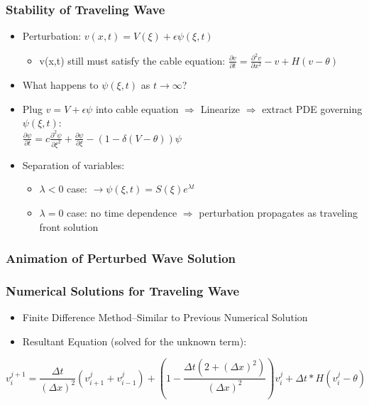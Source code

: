\documentclass{beamer}
\begin{document}
\begin{frame}
\frametitle{Stability of Traveling Wave}
\begin{itemize}
	\item Perturbation: $v(x,t)=V(\xi)+\epsilon\psi(\xi,t)$
		\begin{itemize}
			\item v(x,t) still must satisfy the cable equation: $\frac{\partial v}{\partial t}=\frac{\partial ^2 v}{\partial x^2}-v+H(v-\theta)$
		\end{itemize}
	\item What happens to $\psi(\xi,t)$ as $t\rightarrow\infty$?
	\item Plug $v=V+\epsilon\psi$ into cable equation $\Rightarrow$ Linearize $\Rightarrow$ extract PDE governing $\psi(\xi,t)$:\\
	$\frac{\partial \psi}{\partial t} = c \frac{\partial^2\psi}{\partial\xi^2} + \frac{\partial\psi}{\partial\xi} - (1 - \delta(V-\theta))\psi$
	\item Separation of variables: 
		\begin{itemize}
		\item $\lambda<0$ case: $\rightarrow\psi(\xi,t)=S(\xi)e^{\lambda t}$
		\item $\lambda=0$ case: no time dependence $\Rightarrow$ perturbation propagates as traveling front solution
		\end{itemize}
\end{itemize}
\end{frame}

\begin{frame}
\frametitle{Animation of Perturbed Wave Solution}
\end{frame}

\begin{frame}
\frametitle{Numerical Solutions for Traveling Wave}
\begin{itemize}
	\item{Finite Difference Method--Similar to Previous Numerical Solution}
	\item{Resultant Equation (solved for the unknown term):}
\end{itemize}
\[v^{j+1}_i=\frac{\Delta{t}}{(\Delta{x})^2}(v^{j}_{i+1}+v^{j}_{i-1})+(1-\frac{\Delta{t}(2+(\Delta{x})^2)}{(\Delta{x})^2})v^{j}_{i}+\Delta{t}*H(v^j_i-\theta)\]


\end{frame}
\end{document}
